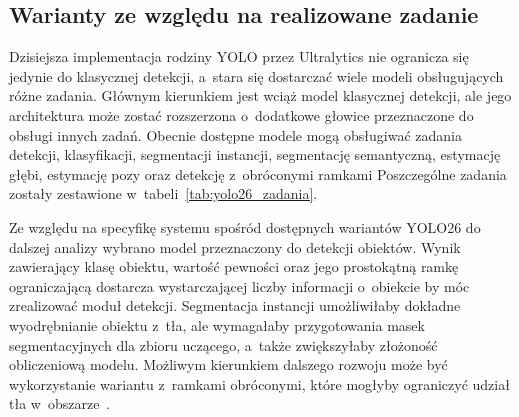 \subsection{Warianty ze względu na realizowane zadanie}
\label{ssec:warianty_zadanie}

Dzisiejsza implementacja rodziny YOLO przez Ultralytics nie ogranicza się jedynie do klasycznej detekcji, a~stara się dostarczać wiele modeli obsługujących różne zadania. Głównym kierunkiem jest wciąż model klasycznej detekcji, ale jego architektura może zostać rozszerzona o~dodatkowe głowice przeznaczone do obsługi innych zadań. Obecnie dostępne modele mogą obsługiwać zadania detekcji, klasyfikacji, segmentacji instancji, segmentację semantyczną, estymację głębi, estymację pozy oraz detekcję z~obróconymi ramkami \cite{bib:ultralyticsYOLO26} Poszczególne zadania zostały zestawione w~tabeli~\ref{tab:yolo26_zadania}.

Ze względu na specyfikę systemu spośród dostępnych wariantów YOLO26 do dalszej analizy wybrano model przeznaczony do detekcji obiektów. Wynik zawierający klasę obiektu, wartość pewności oraz jego prostokątną ramkę ograniczającą dostarcza wystarczającej liczby informacji o~obiekcie by móc zrealizować moduł detekcji. Segmentacja instancji umożliwiłaby dokładne wyodrębnianie obiektu z~tła, ale wymagałaby przygotowania masek segmentacyjnych dla zbioru uczącego, a~także zwiększyłaby złożoność obliczeniową modelu. Możliwym kierunkiem dalszego rozwoju może być wykorzystanie wariantu z~ramkami obróconymi, które mogłyby ograniczyć udział tła w~obszarze~.

